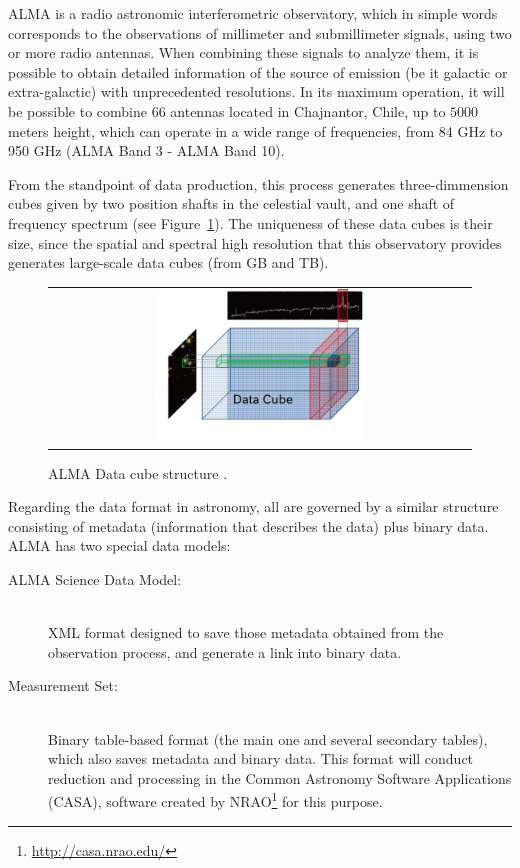 \documentclass[]{spie}
\begin{document}
ALMA is a radio astronomic interferometric observatory, which in simple words
corresponds to the observations of millimeter and submillimeter signals, using
two or more radio antennas.  When combining these signals to analyze them, it is
possible to obtain detailed information of the source of emission (be it
galactic or extra-galactic) with unprecedented resolutions.  In its maximum
operation, it will be possible to combine 66 antennas located in Chajnantor,
Chile, up to $5000$ meters height, which can operate in a wide range of
frequencies, from 84 GHz to 950 GHz (ALMA Band 3 - ALMA Band 10).

From the standpoint of data production, this process generates three-dimmension
cubes given by two position shafts in the celestial vault, and one shaft of
frequency spectrum (see Figure~\ref{fig:cube}).  The uniqueness of these data cubes is their
size, since the spatial and spectral high resolution that this observatory
provides generates large-scale data cubes (from GB and TB).

\begin{figure}
   \begin{center}
   \begin{tabular}{c}
   \includegraphics[width=0.5\textwidth]{images/cube.png}
   \end{tabular}
   \end{center}
   \caption[example]
   { \label{fig:cube} ALMA Data cube structure \cite{dent20132}.}
\end{figure}


Regarding the data format in astronomy, all are governed by a similar structure
consisting of metadata (information that describes the data) plus binary data.
ALMA has two special data models:
\begin{description}
    \item[ALMA Science Data Model:] \hfill \\
        XML format designed to save those metadata obtained from the observation
        process, and generate a link into binary data.
    \item[Measurement Set:] \hfill \\
        Binary table-based format (the main one and several secondary tables),
        which also saves metadata and binary data. This format will conduct
        reduction and processing in the Common Astronomy Software Applications
        (CASA), software created by NRAO\footnote{\url{http://casa.nrao.edu/}} for this purpose.
\end{description}
\end{document}

